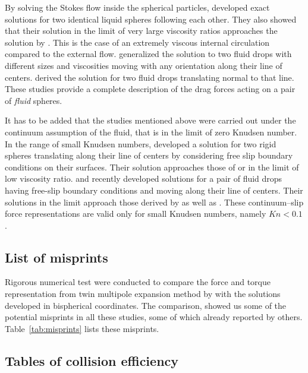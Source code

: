 \documentclass[../thesis.tex]{subfiles}
\begin{document}
By solving the Stokes flow inside the spherical particles, \citet{WW72} developed exact solutions for two identical liquid spheres following each other. They also showed that their solution in the limit of very large viscosity ratios approaches the  solution by \citet{SJ26}. This is the case of an extremely viscous internal circulation compared to the external flow. \citet{HHS73} generalized the solution to two fluid drops with different sizes and viscosities moving with any orientation along their line of centers. \citet{Z80} derived the solution for two fluid drops translating normal to that line. These studies provide a complete description of the drag forces acting on a pair of \textit{fluid} spheres.

It has to be added that the studies mentioned above were carried out under the continuum assumption of the fluid, that is in the limit of zero Knudsen number. In the range of small Knudsen numbers, \citet{RM74} developed a solution for two rigid spheres translating along their line of centers by considering free slip boundary conditions on their surfaces. Their solution approaches those of \citet{WW72} or \citet{HHS73} in the limit of low viscosity ratio. \citet{G96} and recently \citet{RSD22} developed solutions for a pair of fluid drops having free-slip boundary conditions and moving along their line of centers. Their solutions in the limit approach those derived by \citet{RM74} as well as \citet{HHS73}. These continuum--slip force representations are valid only for small Knudsen numbers, namely $Kn < 0.1$.



\subsection{List of misprints}%
Rigorous numerical test were conducted to compare the force and torque representation from twin multipole expansion method by \citet{JO84} with the solutions developed in bispherical coordinates. The comparison, showed us some of the potential misprints in all these studies, some of which already reported by others. Table~\ref{tab:misprints} lists these misprints.



\subsection{Tables of collision efficiency\label{sec:E12}}
\end{document}
